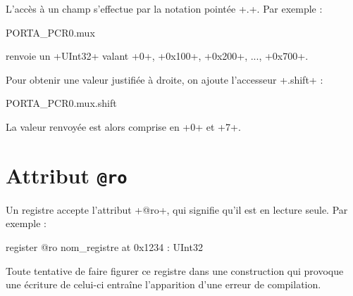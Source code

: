 L'accès à un champ s'effectue par la notation pointée \plm+.+. Par exemple :
\begin{PLM}
PORTA_PCR0.mux
\end{PLM}

renvoie un \plm+UInt32+ valant \plm+0+, \plm+0x100+, \plm+0x200+, ..., \plm+0x700+.

Pour obtenir une valeur justifiée à droite, on ajoute l'accesseur \plm+.shift+ :
\begin{PLM}
PORTA_PCR0.mux.shift
\end{PLM}

La valeur renvoyée est alors comprise en \plm+0+ et \plm+7+.

\section{Attribut \texttt{@ro}}
Un registre accepte l'attribut \plm+@ro+, qui signifie qu'il est en lecture seule. Par exemple :
\begin{PLM}
register @ro nom_registre at 0x1234 : UInt32
\end{PLM}

Toute tentative de faire figurer ce registre dans une construction qui provoque une écriture de celui-ci entraîne l'apparition d'une erreur de compilation.

